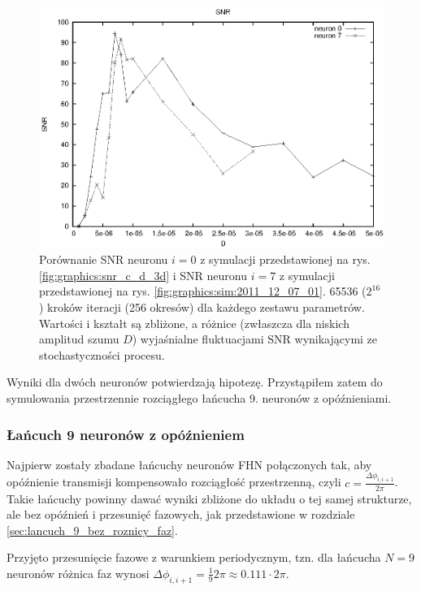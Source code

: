   \begin{figure}
    \includegraphics[width=140mm]{images/compare/n07}
    \caption{Porównanie SNR neuronu $i=0$ z symulacji przedstawionej na rys. \ref{fig:graphics:snr_c_d_3d} i SNR neuronu $i=7$ z symulacji przedstawionej na rys. \ref{fig:graphics:sim:2011_12_07_01}. 65536 ($2^{16}$) kroków iteracji (256 okresów) dla każdego zestawu parametrów. Wartości i kształt są zbliżone, a różnice (zwłaszcza dla niskich amplitud szumu $D$) wyjaśnialne fluktuacjami SNR wynikającymi ze stochastyczności procesu.}
    \label{fig:graphics:snr_comparison}
  \end{figure}

  Wyniki dla dwóch neuronów potwierdzają hipotezę. Przystąpiłem zatem do symulowania przestrzennie rozciągłego łańcucha 9. neuronów z opóźnieniami.

  \subsubsection{Łańcuch 9 neuronów z opóźnieniem}

  Najpierw zostały zbadane łańcuchy neuronów FHN połączonych tak, aby opóźnienie transmisji kompensowało rozciągłość przestrzenną, czyli $c = \frac{\Delta \phi_{i,i+1}}{2 \pi}$. Takie łańcuchy powinny dawać wyniki zbliżone do układu o tej samej strukturze, ale bez opóźnień i przesunięć fazowych, jak przedstawione w rozdziale \ref{sec:lancuch_9_bez_roznicy_faz}.

  Przyjęto przesunięcie fazowe z warunkiem periodycznym, tzn. dla łańcucha $N=9$ neuronów różnica faz wynosi $\Delta \phi_{i,i+1} = \frac{1}{9} 2 \pi \approx 0.111 \cdot 2 \pi$.
  
